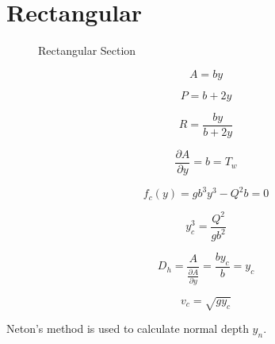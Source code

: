 
\section{Rectangular}

\begin{figure}[h]
\centering
{}
\caption{Rectangular Section}
\end{figure}

\begin{equation}
A = by
\end{equation}

\begin{equation}
P = b + 2y
\end{equation}

\begin{equation}
R = \frac{by}{b+2y}
\end{equation}

\begin{equation}
\frac{\partial A}{\partial y} = b = T_w
\end{equation}

\begin{equation}  
f_c(y)= gb^3y^3 -Q^2b= 0
\end{equation}

\begin{equation}  
y_c^3 = \frac{Q^2}{gb^2}
\end{equation}

\begin{equation}  
D_h = \frac{A}{\frac{\partial A}{\partial y}} = \frac{by_c}{b} = y_c
\end{equation}

\begin{equation}  
v_c = \sqrt{g y_c}
\end{equation}

\noindent Neton's method is used to calculate normal depth $y_n$.